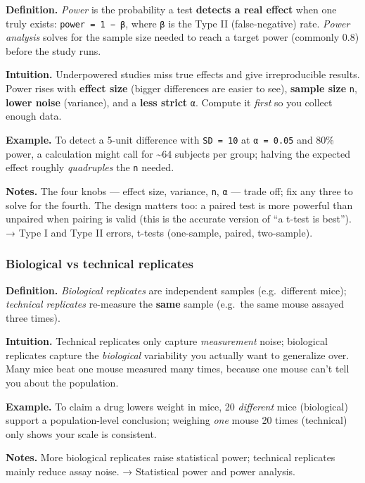 \documentclass[
  10pt,
  letterpaper,
  onecolumn]{article}
\begin{document}
\textbf{Definition.} \emph{Power} is the probability a test
\textbf{detects a real effect} when one truly exists:
\texttt{power\ =\ 1\ −\ β}, where \texttt{β} is the Type II
(false-negative) rate. \emph{Power analysis} solves for the sample size
needed to reach a target power (commonly 0.8) before the study runs.

\textbf{Intuition.} Underpowered studies miss true effects and give
irreproducible results. Power rises with \textbf{effect size} (bigger
differences are easier to see), \textbf{sample size} \texttt{n},
\textbf{lower noise} (variance), and a \textbf{less strict} \texttt{α}.
Compute it \emph{first} so you collect enough data.

\textbf{Example.} To detect a 5-unit difference with \texttt{SD\ =\ 10}
at \texttt{α\ =\ 0.05} and 80\% power, a calculation might call for
\textasciitilde64 subjects per group; halving the expected effect
roughly \emph{quadruples} the \texttt{n} needed.

\textbf{Notes.} The four knobs --- effect size, variance, \texttt{n},
\texttt{α} --- trade off; fix any three to solve for the fourth. The
design matters too: a paired test is more powerful than unpaired when
pairing is valid (this is the accurate version of ``a t-test is best'').
→ Type I and Type II errors, t-tests (one-sample, paired, two-sample).

\hypertarget{biological-vs-technical-replicates}{%
\subsubsection{Biological vs technical
replicates}\label{biological-vs-technical-replicates}}

\textbf{Definition.} \emph{Biological replicates} are independent
samples (e.g.~different mice); \emph{technical replicates} re-measure
the \textbf{same} sample (e.g.~the same mouse assayed three times).

\textbf{Intuition.} Technical replicates only capture \emph{measurement}
noise; biological replicates capture the \emph{biological} variability
you actually want to generalize over. Many mice beat one mouse measured
many times, because one mouse can't tell you about the population.

\textbf{Example.} To claim a drug lowers weight in mice, 20
\emph{different} mice (biological) support a population-level
conclusion; weighing \emph{one} mouse 20 times (technical) only shows
your scale is consistent.

\textbf{Notes.} More biological replicates raise statistical power;
technical replicates mainly reduce assay noise. → Statistical power and
power analysis.
\end{document}
